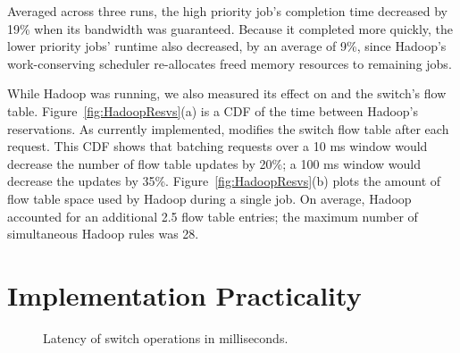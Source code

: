 Averaged across three runs, the high priority job's completion
time decreased by 19\% when its bandwidth was guaranteed.
Because it completed more quickly, the lower priority jobs' runtime also
decreased, by an average of  9\%, since Hadoop's work-conserving scheduler re-allocates
freed memory resources to remaining jobs.

While Hadoop was running, we also measured its effect on \sys and
the switch's flow table. Figure~\ref{fig:HadoopResvs}(a) is a CDF of
the time between Hadoop's reservations. As currently implemented,
\sys modifies the switch flow table after each request. This CDF shows
that batching requests over a 10 ms window would decrease the
number of flow table updates by 20\%; a 100 ms window would decrease
the updates by 35\%. Figure~\ref{fig:HadoopResvs}(b) plots the amount
of flow table space used by Hadoop during a single job. On average,
Hadoop accounted for an additional 2.5 flow table entries; the maximum
number of simultaneous Hadoop rules was 28. 

\section{Implementation Practicality}
\label{sec:Microbenchmarks}

\begin{figure}[t]
\centering
{}
\caption{Latency of switch operations in milliseconds.}
\label{fig:SwitchOpLatency}
\end{figure}

